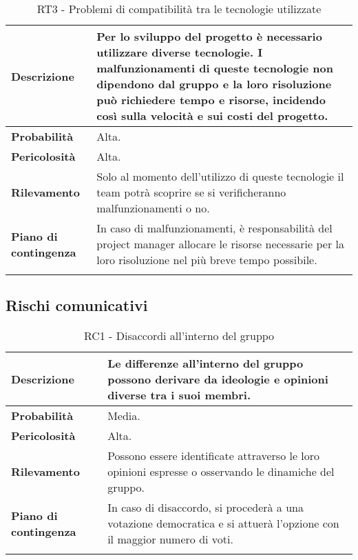\begin{longtable}{|l|p{10cm}|}
    \hline
    \textbf{Descrizione} & Per lo sviluppo del progetto è necessario utilizzare diverse tecnologie. I malfunzionamenti di queste tecnologie non dipendono dal gruppo e la loro risoluzione può richiedere tempo e risorse, incidendo così sulla velocità e sui costi del progetto. \\ 
    \hline
    \textbf{Probabilità} & Alta. \\
    \hline
    \textbf{Pericolosità} & Alta. \\
    \hline
    \textbf{Rilevamento} & Solo al momento dell'utilizzo di queste tecnologie il team potrà scoprire se si verificheranno malfunzionamenti o no.  \\
    \hline
    \textbf{Piano di contingenza} & In caso di malfunzionamenti, è responsabilità del project manager allocare le risorse necessarie per la loro risoluzione nel più breve tempo possibile.\\
    \hline
    \caption{RT3 - Problemi di compatibilità tra le tecnologie utilizzate}
    \label{table:7}
\end{longtable}


\newpage


\subsection{Rischi comunicativi}
\begin{longtable}{|l|p{10cm}|}
    \hline
    \textbf{Descrizione} & Le differenze all'interno del gruppo possono derivare da ideologie e opinioni diverse tra i suoi membri. \\ 
    \hline
    \textbf{Probabilità} & Media. \\
    \hline
    \textbf{Pericolosità} & Alta. \\
    \hline
    \textbf{Rilevamento} & Possono essere identificate attraverso le loro opinioni espresse o osservando le dinamiche del gruppo. \\
    \hline
    \textbf{Piano di contingenza} & In caso di disaccordo, si procederà a una votazione democratica e si attuerà l'opzione con il maggior numero di voti. \\
    \hline
    \caption{RC1 - Disaccordi all'interno del gruppo}
    \label{table:8}
\end{longtable}


